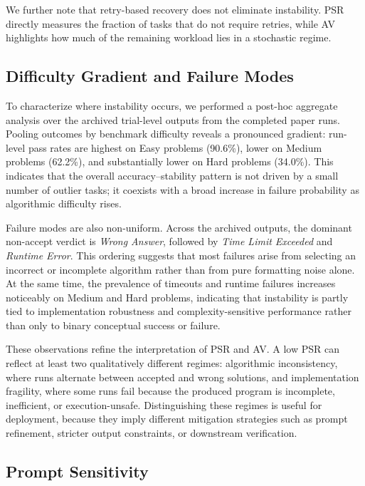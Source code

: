 \documentclass[11pt]{article}
\begin{document}
We further note that retry-based recovery does not eliminate instability. PSR directly measures the fraction of tasks that do not require retries, while AV highlights how much of the remaining workload lies in a stochastic regime.

\subsection{Difficulty Gradient and Failure Modes}

To characterize where instability occurs, we performed a post-hoc aggregate analysis over the archived trial-level outputs from the completed paper runs. Pooling outcomes by benchmark difficulty reveals a pronounced gradient: run-level pass rates are highest on Easy problems (90.6\%), lower on Medium problems (62.2\%), and substantially lower on Hard problems (34.0\%). This indicates that the overall accuracy--stability pattern is not driven by a small number of outlier tasks; it coexists with a broad increase in failure probability as algorithmic difficulty rises.

Failure modes are also non-uniform. Across the archived outputs, the dominant non-accept verdict is \emph{Wrong Answer}, followed by \emph{Time Limit Exceeded} and \emph{Runtime Error}. This ordering suggests that most failures arise from selecting an incorrect or incomplete algorithm rather than from pure formatting noise alone. At the same time, the prevalence of timeouts and runtime failures increases noticeably on Medium and Hard problems, indicating that instability is partly tied to implementation robustness and complexity-sensitive performance rather than only to binary conceptual success or failure.

These observations refine the interpretation of PSR and AV. A low PSR can reflect at least two qualitatively different regimes: algorithmic inconsistency, where runs alternate between accepted and wrong solutions, and implementation fragility, where some runs fail because the produced program is incomplete, inefficient, or execution-unsafe. Distinguishing these regimes is useful for deployment, because they imply different mitigation strategies such as prompt refinement, stricter output constraints, or downstream verification.

\subsection{Prompt Sensitivity}
\end{document}

